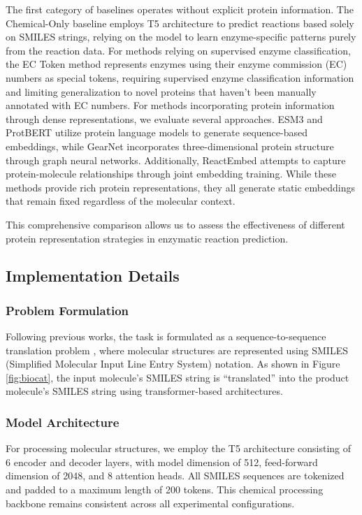 \documentclass[sigconf]{acmart}
\begin{document}
The first category of baselines operates without explicit protein information. The Chemical-Only baseline \cite{kreutter2021predicting} employs T5 architecture to predict reactions based solely on SMILES strings, relying on the model to learn enzyme-specific patterns purely from the reaction data. 
For methods relying on supervised enzyme classification, the EC Token method \cite{Probst2022} represents enzymes using their enzyme commission (EC) numbers as special tokens, requiring supervised enzyme classification information and limiting generalization to novel proteins that haven't been manually annotated with EC numbers.
For methods incorporating protein information through dense representations, we evaluate several approaches. ESM3 \cite{hayes2024simulating} and ProtBERT \cite{brandes2021proteinbert} utilize protein language models to generate sequence-based embeddings, while GearNet \cite{zhang2023protein} incorporates three-dimensional protein structure through graph neural networks. Additionally, ReactEmbed \cite{sicherman2025reactembed} attempts to capture protein-molecule relationships through joint embedding training. While these methods provide rich protein representations, they all generate static embeddings that remain fixed regardless of the molecular context.

This comprehensive comparison allows us to assess the effectiveness of different protein representation strategies in enzymatic reaction prediction.


\subsection{Implementation Details}
\subsubsection{Problem Formulation}
Following previous works, the task is formulated as a sequence-to-sequence translation problem \cite{schwaller2019molecular,gricourt2024artificial,kreutter2021predicting}, where molecular structures are represented using SMILES (Simplified Molecular Input Line Entry System) notation. As shown in Figure \ref{fig:biocat}, the input molecule's SMILES string is ``translated'' into the product molecule's SMILES string using transformer-based architectures.

\subsubsection{Model Architecture}
For processing molecular structures, we employ the T5 architecture consisting of 6 encoder and decoder layers, with model dimension of 512, feed-forward dimension of 2048, and 8 attention heads. All SMILES sequences are tokenized and padded to a maximum length of 200 tokens. This chemical processing backbone remains consistent across all experimental configurations.
\end{document}
